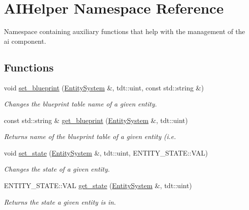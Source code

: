 \hypertarget{namespace_a_i_helper}{}\section{A\+I\+Helper Namespace Reference}
\label{namespace_a_i_helper}


Namespace containing auxiliary functions that help with the management of the ai component.  


\subsection*{Functions}
\begin{DoxyCompactItemize}
\item 
void \hyperlink{namespace_a_i_helper_a7a6f6741410228ca2a6574806952de2f}{set\+\_\+blueprint} (\hyperlink{class_entity_system}{Entity\+System} \&, tdt\+::uint, const std\+::string \&)
\begin{DoxyCompactList}\small\item\em Changes the blueprint table name of a given entity. \end{DoxyCompactList}\item 
const std\+::string \& \hyperlink{namespace_a_i_helper_a1787853e98296957e3deedb4f671644c}{get\+\_\+blueprint} (\hyperlink{class_entity_system}{Entity\+System} \&, tdt\+::uint)
\begin{DoxyCompactList}\small\item\em Returns name of the blueprint table of a given entity (i.\+e. \end{DoxyCompactList}\item 
void \hyperlink{namespace_a_i_helper_a701c7f2d0e18b190f3366d05570dc680}{set\+\_\+state} (\hyperlink{class_entity_system}{Entity\+System} \&, tdt\+::uint, E\+N\+T\+I\+T\+Y\+\_\+\+S\+T\+A\+T\+E\+::\+V\+AL)
\begin{DoxyCompactList}\small\item\em Changes the state of a given entity. \end{DoxyCompactList}\item 
E\+N\+T\+I\+T\+Y\+\_\+\+S\+T\+A\+T\+E\+::\+V\+AL \hyperlink{namespace_a_i_helper_ac2cf572f0e1e009bf0c9793fcebd17f4}{get\+\_\+state} (\hyperlink{class_entity_system}{Entity\+System} \&, tdt\+::uint)
\begin{DoxyCompactList}\small\item\em Returns the state a given entity is in. \end{DoxyCompactList}\end{DoxyCompactItemize}


